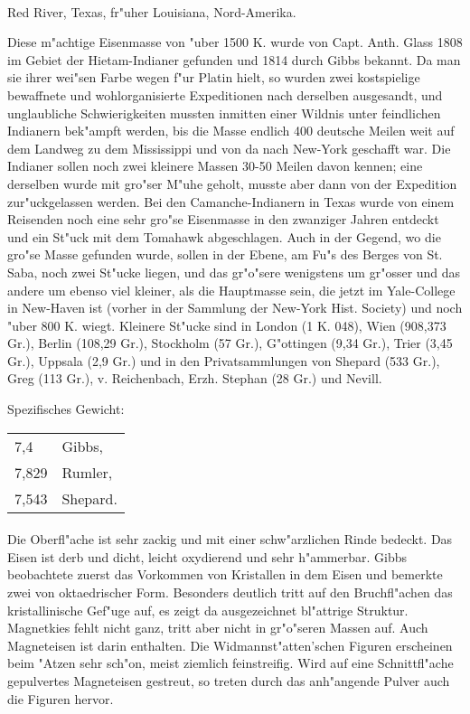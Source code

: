 \documentclass[a4paper, 11pt, oneside]{article}
\begin{document}
\paragraph{}
Red River, Texas, fr"uher Louisiana, Nord-Amerika.

Diese m"achtige Eisenmasse von "uber 1500 K. wurde von Capt. Anth. Glass 1808 im Gebiet der Hietam-Indianer gefunden und 1814 durch Gibbs bekannt. Da man sie ihrer wei"sen Farbe wegen f"ur Platin hielt, so wurden zwei kostspielige bewaffnete und wohlorganisierte Expeditionen nach derselben ausgesandt, und unglaubliche Schwierigkeiten mussten inmitten einer Wildnis unter feindlichen Indianern bek"ampft werden, bis die Masse endlich 400 deutsche Meilen weit auf dem Landweg zu dem Mississippi und von da nach New-York geschafft war. Die Indianer sollen noch zwei kleinere Massen 30-50 Meilen davon kennen; eine derselben wurde mit gro"ser M"uhe geholt, musste aber dann von der Expedition zur"uckgelassen werden. Bei den Camanche-Indianern in Texas wurde von einem Reisenden noch eine sehr gro"se Eisenmasse in den zwanziger Jahren entdeckt und ein St"uck mit dem Tomahawk abgeschlagen. Auch in der Gegend, wo die gro"se Masse gefunden wurde, sollen in der Ebene, am Fu"s des Berges von St. Saba, noch zwei St"ucke liegen, und das gr"o"sere wenigstens um gr"osser und das andere um ebenso viel kleiner, als die Hauptmasse sein, die jetzt im Yale-College in New-Haven ist (vorher in der Sammlung der New-York Hist. Society) und noch "uber 800 K. wiegt. Kleinere St"ucke sind in London (1 K. 048), Wien (908,373 Gr.), Berlin (108,29 Gr.), Stockholm (57 Gr.), G"ottingen (9,34 Gr.), Trier (3,45 Gr.), Uppsala (2,9 Gr.) und in den Privatsammlungen von Shepard (533 Gr.), Greg (113 Gr.), v. Reichenbach, Erzh. Stephan (28 Gr.) und Nevill.

Spezifisches Gewicht:  
\begin{table}[!ht]
    \centering
    \begin{tabular}{l l}
        7,4 & Gibbs,\\
        7,829 & Rumler,\\
        7,543 & Shepard.
    \end{tabular}
\end{table}
\paragraph{}
Die Oberfl"ache ist sehr zackig und mit einer schw"arzlichen Rinde bedeckt. Das Eisen ist derb und dicht, leicht oxydierend und sehr h"ammerbar. Gibbs beobachtete zuerst das Vorkommen von Kristallen in dem Eisen und bemerkte zwei von oktaedrischer Form. Besonders deutlich tritt auf den Bruchfl"achen das kristallinische Gef"uge auf, es zeigt da ausgezeichnet bl"attrige Struktur. Magnetkies fehlt nicht ganz, tritt aber nicht in gr"o"seren Massen auf. Auch Magneteisen ist darin enthalten. Die Widmannst"atten'schen Figuren erscheinen beim "Atzen sehr sch"on, meist ziemlich feinstreifig. Wird auf eine Schnittfl"ache gepulvertes Magneteisen gestreut, so treten durch das anh"angende Pulver auch die Figuren hervor.
\end{document}
